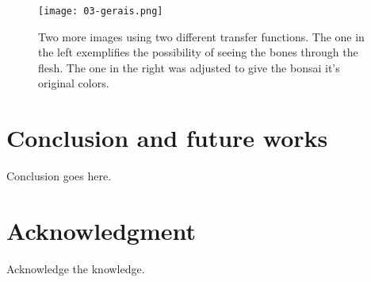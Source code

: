 \documentclass[10pt, conference]{IEEEtran}
\begin{document}
\begin{figure}[h]
\centering
\texttt{[image: 03-gerais.png]}
\caption{Two more images using two different transfer functions. The one in the left exemplifies the possibility of seeing the bones through the flesh. The one in the right was adjusted to give the bonsai it's original colors.}
\label{fig:gerais}
\end{figure}


\section{Conclusion and future works}
\label{sec:conclusion}

Conclusion goes here.



\iffinal
\section*{Acknowledgment}
%
Acknowledge the knowledge.
\fi








\end{document}
